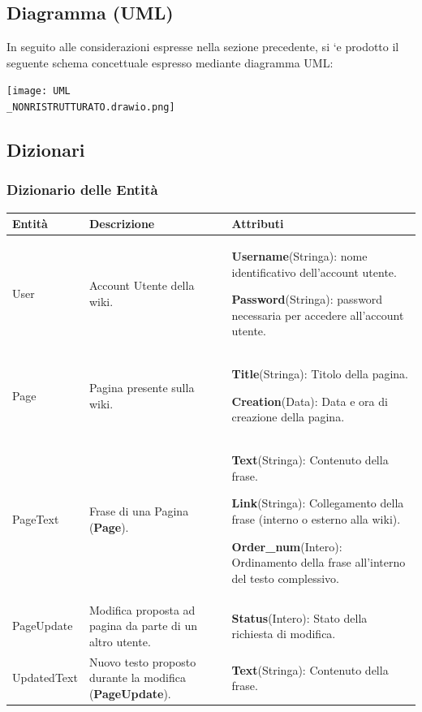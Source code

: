 \documentclass{article}
\begin{document}
{	\newpage
	
	{\subsection{Diagramma (UML)}}
	 In seguito alle considerazioni espresse nella sezione precedente, si `e prodotto
	 il seguente schema concettuale espresso mediante diagramma UML:
	 
	\begin{center}
	\texttt{[image: UML\\\_NONRISTRUTTURATO.drawio.png]}
	\end{center}
	 
	 
	{\subsection{Dizionari}}
	{\subsubsection{Dizionario delle Entità}}
	
	\begin{table}[H]
		\centering
		\small %
		\setlength{\tabcolsep}{6pt} %
		\renewcommand{\arraystretch}{1.2} %
		
		\begin{tabularx}{\textwidth}{|l|X|X|}
			\hline
			\textbf{Entità} & \textbf{Descrizione} & \textbf{Attributi} \\
			\hline
			User & Account Utente della wiki. & 
			\textbf{Username}(Stringa): nome identificativo dell'account utente.
			
			\textbf{Password}(Stringa): password necessaria
			per accedere all’account utente. \\
			\hline
			Page & Pagina presente sulla wiki. & 
			\textbf{Title}(Stringa): Titolo della pagina.
			
			\textbf{Creation}(Data): Data e ora di creazione della pagina.
			\\
			\hline
		    PageText & Frase di una Pagina (\textbf{Page}). &
			\textbf{Text}(Stringa): Contenuto della frase.
			
			\textbf{Link}(Stringa): Collegamento della frase (interno o esterno alla wiki).
			
			\textbf{Order\_num}(Intero): Ordinamento della frase all'interno del testo complessivo.
			\\
			\hline
			PageUpdate & Modifica proposta ad pagina da parte di un altro utente. & 
			\textbf{Status}(Intero): Stato della richiesta di modifica.
			\\
			\hline
			UpdatedText & Nuovo testo proposto durante la modifica (\textbf{PageUpdate}). & 
			\textbf{Text}(Stringa): Contenuto della frase.


\end{tabularx}
\end{table}}
\end{document}
